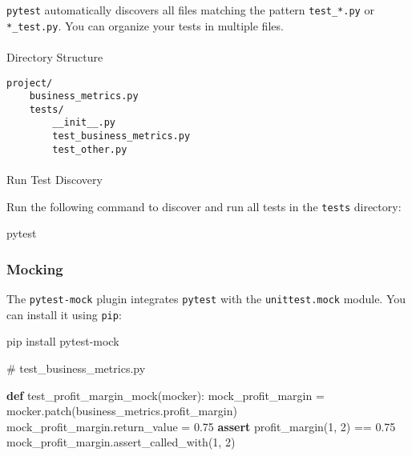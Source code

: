 \documentclass[
  letterpaper,
  DIV=11,
  numbers=noendperiod]{scrreprt}
\makeatletter
\let\oldparagraph\paragraph
\renewcommand{\paragraph}{
    \@ifstar
      \xxxParagraphStar
      \xxxParagraphNoStar
  }
\newcommand{\xxxParagraphStar}[1]{\oldparagraph*{#1}\mbox{}}
\newcommand{\xxxParagraphNoStar}[1]{\oldparagraph{#1}\mbox{}}
\newenvironment{Shaded}{\begin{snugshade}}{\end{snugshade}}
\newcommand{\CommentTok}[1]{\textcolor[rgb]{0.37,0.37,0.37}{#1}}
\newcommand{\ControlFlowTok}[1]{\textcolor[rgb]{0.00,0.23,0.31}{\textbf{#1}}}
\newcommand{\DecValTok}[1]{\textcolor[rgb]{0.68,0.00,0.00}{#1}}
\newcommand{\ExtensionTok}[1]{\textcolor[rgb]{0.00,0.23,0.31}{#1}}
\newcommand{\FloatTok}[1]{\textcolor[rgb]{0.68,0.00,0.00}{#1}}
\newcommand{\KeywordTok}[1]{\textcolor[rgb]{0.00,0.23,0.31}{\textbf{#1}}}
\newcommand{\NormalTok}[1]{\textcolor[rgb]{0.00,0.23,0.31}{#1}}
\newcommand{\OperatorTok}[1]{\textcolor[rgb]{0.37,0.37,0.37}{#1}}
\newcommand{\StringTok}[1]{\textcolor[rgb]{0.13,0.47,0.30}{#1}}
\makeatother
\begin{document}
\texttt{pytest} automatically discovers all files matching the pattern
\texttt{test\_*.py} or \texttt{*\_test.py}. You can organize your tests
in multiple files.

\paragraph{Directory Structure}\label{directory-structure-1}

\begin{verbatim}
project/
    business_metrics.py
    tests/
        __init__.py
        test_business_metrics.py
        test_other.py
\end{verbatim}

\paragraph{Run Test Discovery}\label{run-test-discovery-1}

Run the following command to discover and run all tests in the
\texttt{tests} directory:

\begin{Shaded}
\begin{Highlighting}[]
\ExtensionTok{pytest}
\end{Highlighting}
\end{Shaded}

\subsubsection{Mocking}\label{mocking-1}

The \texttt{pytest-mock} plugin integrates \texttt{pytest} with the
\texttt{unittest.mock} module. You can install it using \texttt{pip}:

\begin{Shaded}
\begin{Highlighting}[]
\ExtensionTok{pip}\NormalTok{ install pytest{-}mock}
\end{Highlighting}
\end{Shaded}

\begin{Shaded}
\begin{Highlighting}[]
\CommentTok{\# test\_business\_metrics.py}

\KeywordTok{def}\NormalTok{ test\_profit\_margin\_mock(mocker):}
\NormalTok{    mock\_profit\_margin }\OperatorTok{=}\NormalTok{ mocker.patch(}\StringTok{\textquotesingle{}business\_metrics.profit\_margin\textquotesingle{}}\NormalTok{)}
\NormalTok{    mock\_profit\_margin.return\_value }\OperatorTok{=} \FloatTok{0.75}
    \ControlFlowTok{assert}\NormalTok{ profit\_margin(}\DecValTok{1}\NormalTok{, }\DecValTok{2}\NormalTok{) }\OperatorTok{==} \FloatTok{0.75}
\NormalTok{    mock\_profit\_margin.assert\_called\_with(}\DecValTok{1}\NormalTok{, }\DecValTok{2}\NormalTok{)}
\end{Highlighting}
\end{Shaded}
\end{document}
